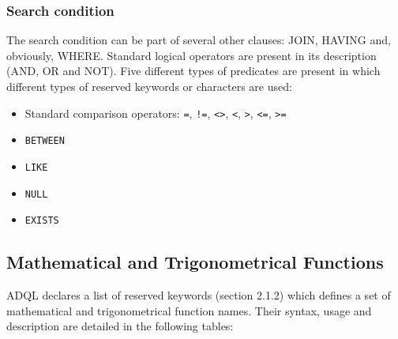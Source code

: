 \documentclass[11pt,a4paper]{ivoa}
\begin{document}
\subsubsection{Search condition}

The search condition can be part of several other clauses: JOIN, HAVING and,
obviously, WHERE. Standard logical operators are present in its description
(AND, OR and NOT). Five different types of predicates are present in which
different types of reserved keywords or characters are used:

\begin{itemize}
\item Standard comparison operators: \verb:=:, \verb:!=:, \verb:<>:, \verb:<:, \verb:>:, \verb:<=:, \verb:>=:
\item \verb:BETWEEN:
\item \verb:LIKE:
\item \verb:NULL:
\item \verb:EXISTS:
\end{itemize}

\subsection{Mathematical and Trigonometrical Functions}

ADQL declares a list of reserved keywords (section 2.1.2) which defines
a set of mathematical and trigonometrical function names. Their syntax,
usage and description are detailed in the following tables:
\end{document}

